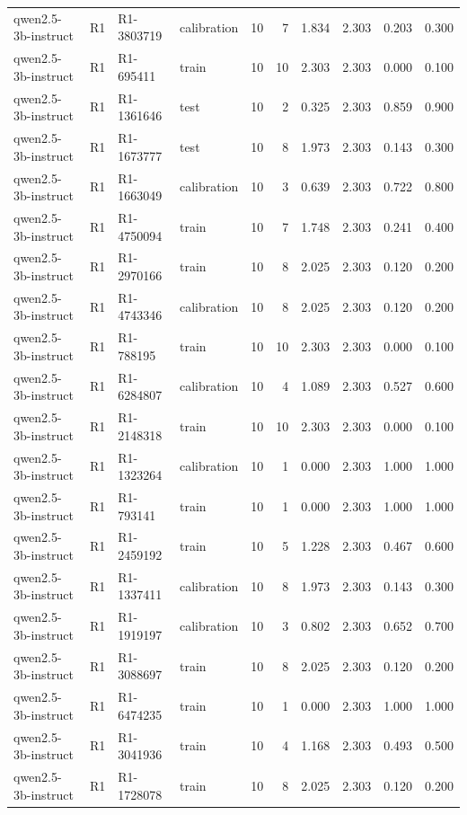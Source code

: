 \begin{table}
\begin{tabular}{llllrrrrrr}
qwen2.5-3b-instruct & R1 & R1-3803719 & calibration & 10 & 7 & 1.834 & 2.303 & 0.203 & 0.300 \\
qwen2.5-3b-instruct & R1 & R1-695411 & train & 10 & 10 & 2.303 & 2.303 & 0.000 & 0.100 \\
qwen2.5-3b-instruct & R1 & R1-1361646 & test & 10 & 2 & 0.325 & 2.303 & 0.859 & 0.900 \\
qwen2.5-3b-instruct & R1 & R1-1673777 & test & 10 & 8 & 1.973 & 2.303 & 0.143 & 0.300 \\
qwen2.5-3b-instruct & R1 & R1-1663049 & calibration & 10 & 3 & 0.639 & 2.303 & 0.722 & 0.800 \\
qwen2.5-3b-instruct & R1 & R1-4750094 & train & 10 & 7 & 1.748 & 2.303 & 0.241 & 0.400 \\
qwen2.5-3b-instruct & R1 & R1-2970166 & train & 10 & 8 & 2.025 & 2.303 & 0.120 & 0.200 \\
qwen2.5-3b-instruct & R1 & R1-4743346 & calibration & 10 & 8 & 2.025 & 2.303 & 0.120 & 0.200 \\
qwen2.5-3b-instruct & R1 & R1-788195 & train & 10 & 10 & 2.303 & 2.303 & 0.000 & 0.100 \\
qwen2.5-3b-instruct & R1 & R1-6284807 & calibration & 10 & 4 & 1.089 & 2.303 & 0.527 & 0.600 \\
qwen2.5-3b-instruct & R1 & R1-2148318 & train & 10 & 10 & 2.303 & 2.303 & 0.000 & 0.100 \\
qwen2.5-3b-instruct & R1 & R1-1323264 & calibration & 10 & 1 & 0.000 & 2.303 & 1.000 & 1.000 \\
qwen2.5-3b-instruct & R1 & R1-793141 & train & 10 & 1 & 0.000 & 2.303 & 1.000 & 1.000 \\
qwen2.5-3b-instruct & R1 & R1-2459192 & train & 10 & 5 & 1.228 & 2.303 & 0.467 & 0.600 \\
qwen2.5-3b-instruct & R1 & R1-1337411 & calibration & 10 & 8 & 1.973 & 2.303 & 0.143 & 0.300 \\
qwen2.5-3b-instruct & R1 & R1-1919197 & calibration & 10 & 3 & 0.802 & 2.303 & 0.652 & 0.700 \\
qwen2.5-3b-instruct & R1 & R1-3088697 & train & 10 & 8 & 2.025 & 2.303 & 0.120 & 0.200 \\
qwen2.5-3b-instruct & R1 & R1-6474235 & train & 10 & 1 & 0.000 & 2.303 & 1.000 & 1.000 \\
qwen2.5-3b-instruct & R1 & R1-3041936 & train & 10 & 4 & 1.168 & 2.303 & 0.493 & 0.500 \\
qwen2.5-3b-instruct & R1 & R1-1728078 & train & 10 & 8 & 2.025 & 2.303 & 0.120 & 0.200 \\

\end{tabular}
\end{table}
